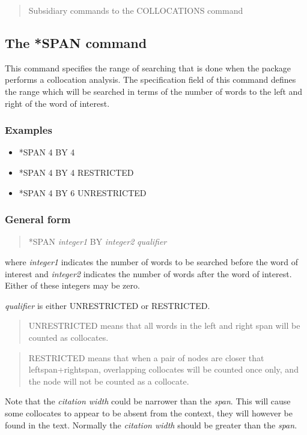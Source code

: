 \begin{quote}
{Subsidiary commands to the COLLOCATIONS command}
\end{quote}
\subsection{The *SPAN command}
This command specifies the range of searching that is done when
the package performs a collocation analysis.  The specification field
of this command defines the range which will be searched in terms
of the number of words to the left and right of the word of interest.

\subsubsection{Examples}
\begin{itemize}
\item *SPAN              4 BY 4
\item *SPAN              4 BY 4 RESTRICTED
\item *SPAN              4 BY 6 UNRESTRICTED
\end{itemize}

\subsubsection{General form}
\begin{quote}
*SPAN              {\em integer1} BY {\em integer2} {\em qualifier}
\end{quote}
where {\em integer1} indicates the number of words to be searched before the
word of interest and {\em integer2} indicates the number of words after the
word of interest. Either of these integers may be zero.

{\em qualifier} is either UNRESTRICTED or RESTRICTED.
\begin{quote}
UNRESTRICTED means that all words in the left and right span will be
counted as collocates.
\end{quote}
\begin{quote}
RESTRICTED means that when a pair of nodes are
closer that leftspan+rightspan, overlapping collocates will be counted
once only, and the node will not be counted as a collocate.
\end{quote}
Note that the {\em citation width} could be narrower than the {\em span}.  This
will cause some collocates to appear to be absent from the context,
they will however be found in the text.  Normally the {\em citation width}
should be greater than the {\em span}.

